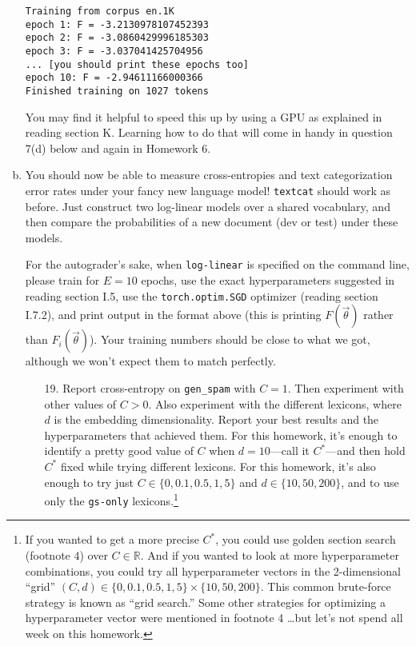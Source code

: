 \documentclass[12pt]{article}
\theoremstyle{plain}
\theoremstyle{definition}
\theoremstyle{remark}
\begin{document}
\begin{enumerate}[(a)]
\begin{verbatim}
Training from corpus en.1K
epoch 1: F = -3.2130978107452393
epoch 2: F = -3.0860429996185303
epoch 3: F = -3.037041425704956
... [you should print these epochs too]
epoch 10: F = -2.94611166000366
Finished training on 1027 tokens
\end{verbatim}

You may find it helpful to speed this up by using a GPU as explained in reading section K. Learning how to do that will come in handy in question 7(d) below and again in Homework 6.

\item You should now be able to measure cross-entropies and text categorization error rates under your fancy new language model! \texttt{textcat} should work as before. Just construct two log-linear models over a shared vocabulary, and then compare the probabilities of a new document (dev or test) under these models.

For the autograder’s sake, when \texttt{log-linear} is specified on the command line, please train for $E=10$ epochs, use the exact hyperparameters suggested in reading section I.5, use the \texttt{torch.optim.SGD} optimizer (reading section I.7.2), and print output in the format above (this is printing $F(\vec{\theta})$ rather than $F_i(\vec{\theta})$). Your training numbers should be close to what we got, although we won’t expect them to match perfectly.

\begin{enumerate}
\item[19.] Report cross-entropy on \texttt{gen\_spam} with $C=1$. Then experiment with other values of $C>0$. Also experiment with the different lexicons, where $d$ is the embedding dimensionality. Report your best results and the hyperparameters that achieved them. For this homework, it’s enough to identify a pretty good value of $C$ when $d=10$—call it $C^*$—and then hold $C^*$ fixed while trying different lexicons. For this homework, it’s also enough to try just $C \in \{0, 0.1, 0.5, 1, 5\}$ and $d \in \{10, 50, 200\}$, and to use only the \texttt{gs-only} lexicons.\footnote{If you wanted to get a more precise $C^*$, you could use golden section search (footnote 4) over $C \in \mathbb{R}$. And if you wanted to look at more hyperparameter combinations, you could try all hyperparameter vectors in the 2-dimensional ``grid'' $(C,d) \in \{0,0.1,0.5,1,5\} \times \{10,50,200\}$. This common brute-force strategy is known as ``grid search.'' Some other strategies for optimizing a hyperparameter vector were mentioned in footnote 4 \ldots but let’s not spend all week on this homework.}


\end{enumerate}
\end{enumerate}
\end{document}
